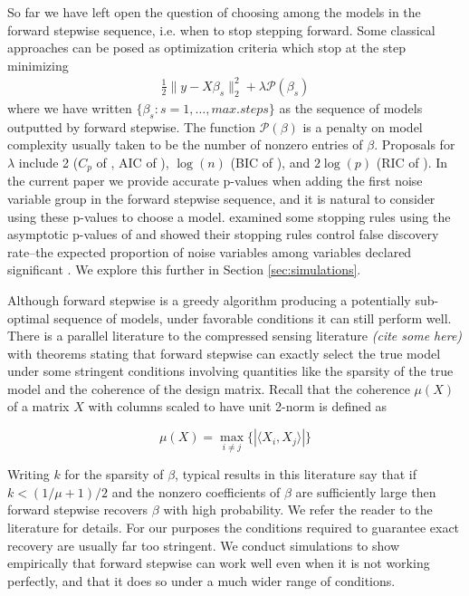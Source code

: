 \documentclass{imsart}
\newcommand{\innerp}[2]{\langle #1 , #2 \rangle}
\newcommand{\pen}{\mathcal{P}}
\begin{document}
So far we have left open the question of choosing among the models in
the forward stepwise sequence, i.e. when to stop stepping
forward. Some classical approaches can be posed as optimization
criteria which stop at the step minimizing
\begin{equation}
\begin{aligned}
\label{eq:subsetregress}
\frac{1}{2} \| y - X \beta_s \|_2^2 + \lambda \pen(\beta_s)
\end{aligned}
\end{equation}
where we have written $\{ \beta_s : s = 1, \ldots, max.steps \}$ as
the sequence of models outputted by forward stepwise. The function
$\pen(\beta)$ is a penalty on model complexity usually taken to be the
number of nonzero entries of $\beta$. Proposals for $\lambda$ include
2 ($C_p$ of \cite{CP}, AIC of \cite{AIC}), $\log(n)$ (BIC of \cite{BIC}), and
$2\log(p)$ (RIC of \cite{RIC}). In the current paper we provide
accurate p-values when adding the first noise variable group in the forward
stepwise sequence, and it is natural to consider using these p-values
to choose a model. \cite{sequential:fdr} examined some stopping rules
using the asymptotic p-values of \cite{significance:lasso} and showed
their stopping rules control false discovery rate--the expected
proportion of noise variables among variables declared significant
\citep{fdr}. We explore this further in Section \ref{sec:simulations}.

Although forward stepwise is a greedy algorithm producing a
potentially sub-optimal sequence of models, under favorable conditions
it can still perform well. There is a parallel literature to the
compressed sensing literature \textit{(cite some here)} with theorems
stating that forward stepwise can exactly select the true model under
some stringent conditions involving quantities like the sparsity of
the true model and the coherence of the design matrix. Recall that the
coherence $\mu(X)$ of a matrix $X$ with columns scaled to have unit
2-norm is defined as

\begin{equation}
  \mu(X) = \max_{i \neq j} \{ | \innerp{ X_i }{ X_j } | \}
\end{equation}

Writing $k$ for the sparsity of $\beta$, typical results in this
literature say that if $k < (1/\mu + 1)/2$ and the nonzero
coefficients of $\beta$ are sufficiently large then forward stepwise
recovers $\beta$ with high probability. We refer the
reader to the literature for details. For our purposes the
conditions required to guarantee exact recovery are usually far too
stringent. We conduct simulations to show empirically that forward
stepwise can work well even when it is not working perfectly, and that
it does so under a much wider range of conditions.
\end{document}
